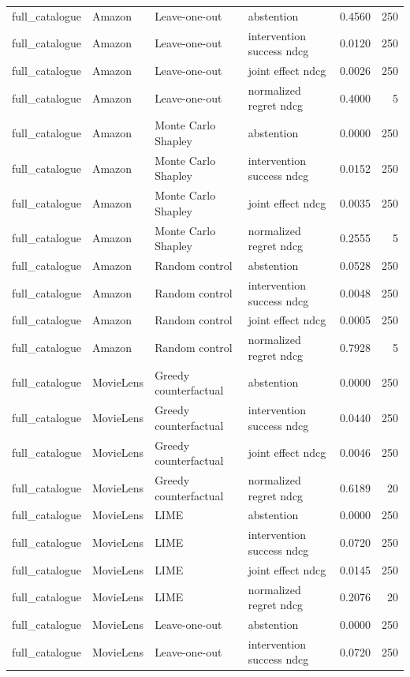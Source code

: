 \begin{longtable}{@{}p{}p{}p{}p{}rr@{}}
full\_catalogue & Amazon & Leave-one-out & abstention & 0.4560 & 250 \\
full\_catalogue & Amazon & Leave-one-out & intervention success ndcg & 0.0120 & 250 \\
full\_catalogue & Amazon & Leave-one-out & joint effect ndcg & 0.0026 & 250 \\
full\_catalogue & Amazon & Leave-one-out & normalized regret ndcg & 0.4000 & 5 \\
full\_catalogue & Amazon & Monte Carlo Shapley & abstention & 0.0000 & 250 \\
full\_catalogue & Amazon & Monte Carlo Shapley & intervention success ndcg & 0.0152 & 250 \\
full\_catalogue & Amazon & Monte Carlo Shapley & joint effect ndcg & 0.0035 & 250 \\
full\_catalogue & Amazon & Monte Carlo Shapley & normalized regret ndcg & 0.2555 & 5 \\
full\_catalogue & Amazon & Random control & abstention & 0.0528 & 250 \\
full\_catalogue & Amazon & Random control & intervention success ndcg & 0.0048 & 250 \\
full\_catalogue & Amazon & Random control & joint effect ndcg & 0.0005 & 250 \\
full\_catalogue & Amazon & Random control & normalized regret ndcg & 0.7928 & 5 \\
full\_catalogue & MovieLens & Greedy counterfactual & abstention & 0.0000 & 250 \\
full\_catalogue & MovieLens & Greedy counterfactual & intervention success ndcg & 0.0440 & 250 \\
full\_catalogue & MovieLens & Greedy counterfactual & joint effect ndcg & 0.0046 & 250 \\
full\_catalogue & MovieLens & Greedy counterfactual & normalized regret ndcg & 0.6189 & 20 \\
full\_catalogue & MovieLens & LIME & abstention & 0.0000 & 250 \\
full\_catalogue & MovieLens & LIME & intervention success ndcg & 0.0720 & 250 \\
full\_catalogue & MovieLens & LIME & joint effect ndcg & 0.0145 & 250 \\
full\_catalogue & MovieLens & LIME & normalized regret ndcg & 0.2076 & 20 \\
full\_catalogue & MovieLens & Leave-one-out & abstention & 0.0000 & 250 \\
full\_catalogue & MovieLens & Leave-one-out & intervention success ndcg & 0.0720 & 250 \\

\end{longtable}
